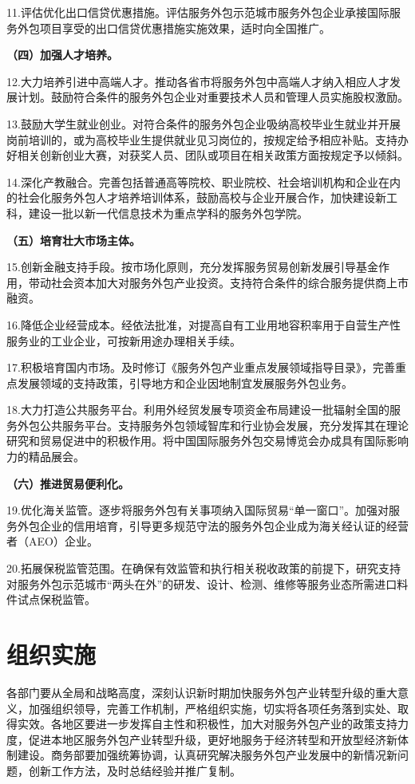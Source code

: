 11.评估优化出口信贷优惠措施。评估服务外包示范城市服务外包企业承接国际服务外包项目享受的出口信贷优惠措施实施效果，适时向全国推广。

{ \bf （四）加强人才培养。 }

12.大力培养引进中高端人才。推动各省市将服务外包中高端人才纳入相应人才发展计划。鼓励符合条件的服务外包企业对重要技术人员和管理人员实施股权激励。

13.鼓励大学生就业创业。对符合条件的服务外包企业吸纳高校毕业生就业并开展岗前培训的，或为高校毕业生提供就业见习岗位的，按规定给予相应补贴。支持办好相关创新创业大赛，对获奖人员、团队或项目在相关政策方面按规定予以倾斜。

14.深化产教融合。完善包括普通高等院校、职业院校、社会培训机构和企业在内的社会化服务外包人才培养培训体系，鼓励高校与企业开展合作，加快建设新工科，建设一批以新一代信息技术为重点学科的服务外包学院。

{ \bf （五）培育壮大市场主体。 }

15.创新金融支持手段。按市场化原则，充分发挥服务贸易创新发展引导基金作用，带动社会资本加大对服务外包产业投资。支持符合条件的综合服务提供商上市融资。

16.降低企业经营成本。经依法批准，对提高自有工业用地容积率用于自营生产性服务业的工业企业，可按新用途办理相关手续。

17.积极培育国内市场。及时修订《服务外包产业重点发展领域指导目录》，完善重点发展领域的支持政策，引导地方和企业因地制宜发展服务外包业务。

18.大力打造公共服务平台。利用外经贸发展专项资金布局建设一批辐射全国的服务外包公共服务平台。支持服务外包领域智库和行业协会发展，充分发挥其在理论研究和贸易促进中的积极作用。将中国国际服务外包交易博览会办成具有国际影响力的精品展会。

{ \bf （六）推进贸易便利化。 }

19.优化海关监管。逐步将服务外包有关事项纳入国际贸易“单一窗口”。加强对服务外包企业的信用培育，引导更多规范守法的服务外包企业成为海关经认证的经营者（AEO）企业。

20.拓展保税监管范围。在确保有效监管和执行相关税收政策的前提下，研究支持对服务外包示范城市“两头在外”的研发、设计、检测、维修等服务业态所需进口料件试点保税监管。

\section{组织实施}

各部门要从全局和战略高度，深刻认识新时期加快服务外包产业转型升级的重大意义，加强组织领导，完善工作机制，严格组织实施，切实将各项任务落到实处、取得实效。各地区要进一步发挥自主性和积极性，加大对服务外包产业的政策支持力度，促进本地区服务外包产业转型升级，更好地服务于经济转型和开放型经济新体制建设。商务部要加强统筹协调，认真研究解决服务外包产业发展中的新情况新问题，创新工作方法，及时总结经验并推广复制。

~\newline



